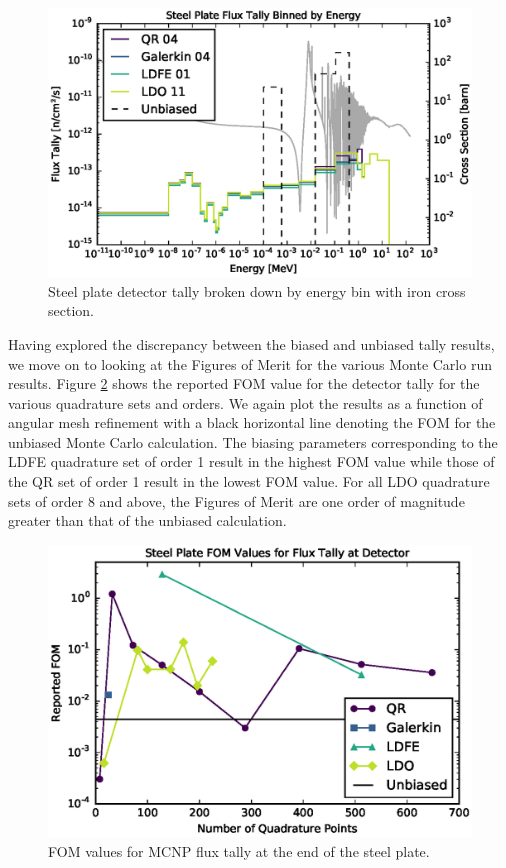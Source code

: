 \begin{figure}[!hbt]
\centering
\includegraphics[max height=0.445\textheight]{img/steel-plots/mcnp/ebin-hist-xs.eps}
\caption{Steel plate detector tally broken down by energy bin with iron cross 
         section.}
\label{hist-xs}
\end{figure}

\FloatBarrier
Having explored the discrepancy between the biased and unbiased tally
results, we move on to looking at the Figures of Merit for the various Monte Carlo 
run results. Figure \ref{steel-cad-fom} shows the reported FOM value for the detector
tally for the various quadrature sets and orders. We again plot the results as a
function of angular mesh refinement with a black horizontal line denoting the FOM for
the unbiased Monte Carlo calculation. The biasing parameters corresponding to the 
LDFE quadrature set of order 1 result in the highest FOM value while those of the QR
set of order 1 result in the lowest FOM value. For all LDO quadrature sets of order 8
and above, the Figures of Merit are one order of magnitude greater than that of the
unbiased calculation.

\begin{figure}[!htb]
\centering
\includegraphics[max height=0.445\textheight]{img/steel-plots/mcnp/cadis-fom-4.eps}
\caption{FOM values for MCNP flux tally at the end of the steel plate.}
\label{steel-cad-fom}
\end{figure}

